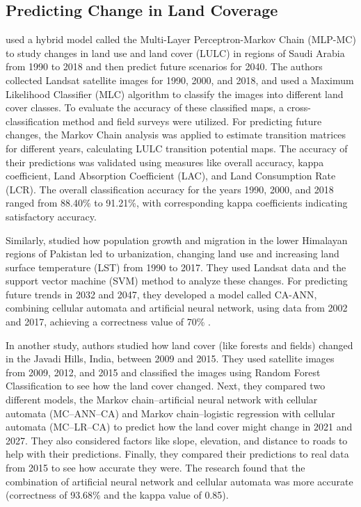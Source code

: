 \subsection{Predicting Change in Land Coverage}


 used a hybrid model called the Multi-Layer Perceptron-Markov Chain (MLP-MC) to study changes in land use and land cover (LULC) in regions of Saudi Arabia from 1990 to 2018 and then predict future scenarios for 2040. The authors collected Landsat satellite images for 1990, 2000, and 2018, and used a Maximum Likelihood Classifier (MLC) algorithm to classify the images into different land cover classes. To evaluate the accuracy of these classified maps, a cross-classification method and field surveys were utilized. For predicting future changes, the Markov Chain analysis was applied to estimate transition matrices for different years, calculating LULC transition potential maps. The accuracy of their predictions was validated using measures like overall accuracy, kappa coefficient, Land Absorption Coefficient (LAC), and Land Consumption Rate (LCR). The overall classification accuracy for the years 1990, 2000, and 2018 ranged from 88.40\% to 91.21\%, with corresponding kappa coefficients indicating satisfactory accuracy.

Similarly,  studied how population growth and migration in the lower Himalayan regions of Pakistan led to urbanization, changing land use and increasing land surface temperature (LST) from 1990 to 2017. They used Landsat data and the support vector machine (SVM) method to analyze these changes. For predicting future trends in 2032 and 2047, they developed a model called CA-ANN, combining cellular automata and artificial neural network, using data from 2002 and 2017, achieving a correctness value of 70\% .

In another study, authors  studied how land cover (like forests and fields) changed in the Javadi Hills, India, between 2009 and 2015. They used satellite images from 2009, 2012, and 2015 and classified the images using Random Forest Classification to see how the land cover changed. Next, they compared two different models, the Markov chain–artificial neural network with cellular automata (MC–ANN–CA) and Markov chain–logistic
regression with cellular automata (MC–LR–CA) to predict how the land cover might change in 2021 and 2027. They also considered factors like slope, elevation, and distance to roads to help with their predictions. Finally, they compared their predictions to real data from 2015 to see how accurate they were. The research found that the combination of artificial neural network and cellular automata was more accurate (correctness of 93.68\% and the kappa
value of 0.85).

